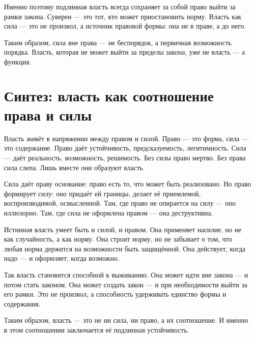 Именно поэтому подлинная власть всегда сохраняет за собой право выйти за рамки закона. Суверен — это тот, кто может приостановить норму. Власть как сила — это не произвол, а источник правовой формы: она не в праве, а до него.

Таким образом, сила вне права — не беспорядок, а первичная возможность порядка. Власть, которая не может выйти за пределы закона, уже не власть — а функция.

\section{Синтез: власть как соотношение права и силы}

Власть живёт в напряжении между правом и силой. Право — это форма, сила — это содержание. Право даёт устойчивость, предсказуемость, легитимность. Сила — даёт реальность, возможность, решимость. Без силы право мертво. Без права сила слепа. Лишь вместе они образуют власть.

Сила даёт праву основание: право есть то, что может быть реализовано. Но право формирует силу: оно придаёт ей границы, делает её приемлемой, воспроизводимой, осмысленной. Там, где право не опирается на силу — оно иллюзорно. Там, где сила не оформлена правом — она деструктивна.

Истинная власть умеет быть и силой, и правом. Она применяет насилие, но не как случайность, а как норму. Она строит норму, но не забывает о том, что любая норма держится на возможности быть защищённой. Она действует, когда надо — и оформляет, когда возможно.

Так власть становится способной к выживанию. Она может идти вне закона — и потом стать законом. Она может создать закон — и при необходимости выйти за его рамки. Это не произвол, а способность удерживать единство формы и содержания.

Таким образом, власть — это не ни сила, ни право, а их соотношение. И именно в этом соотношении заключается её подлинная устойчивость.
